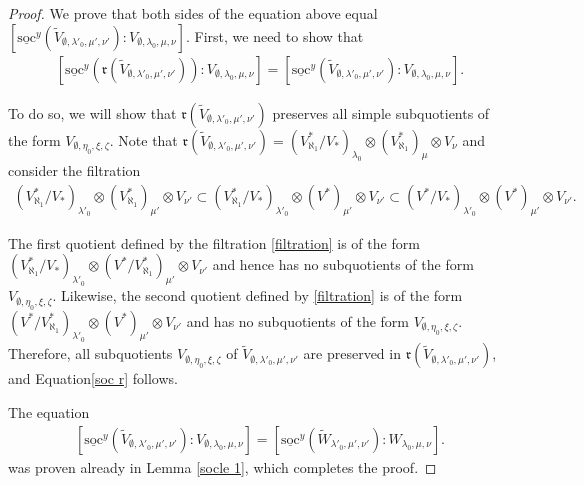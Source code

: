 \documentclass[openany, a4paper]{amsbook}
\theoremstyle{definition}
\numberwithin{equation}{chapter}
\newcommand{\socl}[2]{\underline{\mathrm{soc}}^{#1}({#2})}
\begin{document}
\begin{proof}
    We prove that both sides of the equation above equal $ \left[ \socl{y}{\tilde{V}_{\emptyset, \lambda'_0, \mu', \nu'}} \colon V_{\emptyset, \lambda_0, \mu, \nu}  \right] $. First, we need to show that
    \begin{align}\label{soc r}
        \left[ \socl{y}{\mathfrak{r}(\tilde{ V}_{\emptyset, \lambda'_0, \mu', \nu'})} \colon V_{\emptyset, \lambda_0, \mu, \nu}  \right] 
        = \left[ \socl{y}{\tilde{ V}_{\emptyset, \lambda'_0, \mu', \nu'}} \colon V_{\emptyset, \lambda_0, \mu, \nu}  \right].
    \end{align}

    To do so, we will show that $\mathfrak{r}(\tilde{ V}_{\emptyset, \lambda'_0, \mu', \nu'})$ preserves all simple subquotients of the form $V_{\emptyset, \eta_0, \xi, \zeta}$. Note that $\mathfrak{r}(\tilde{ V}_{\emptyset, \lambda'_0, \mu', \nu'}) = 
    (V^{\ast}_{\aleph_1}/V_{\ast})_{\lambda_0} \otimes (V^{\ast}_{\aleph_1})_\mu \otimes V_\nu $ and consider the filtration 
    \begin{align}\label{filtration}
        (V^{\ast}_{\aleph_1}/V_{\ast})_{\lambda'_0} \otimes (V^{\ast}_{\aleph_1})_{\mu'} \otimes V_{\nu'} 
        \subset (V^{\ast}_{\aleph_1}/V_{\ast})_{\lambda'_0} \otimes (V^{\ast})_{\mu'} \otimes V_{\nu'}
        \subset (V^{\ast}/V_{\ast})_{\lambda'_0} \otimes (V^{\ast})_{\mu'} \otimes V_{\nu'}.
    \end{align}

    The first quotient defined by the filtration \eqref{filtration} is of the form $ (V^{\ast}_{\aleph_1}/V_{\ast})_{\lambda'_0} \otimes (V^{\ast}/V^{\ast}_{\aleph_1})_{\mu'} \otimes V_{\nu'}$ and hence has no subquotients of the form $V_{\emptyset, \eta_0, \xi, \zeta}$. Likewise, the second quotient defined by \eqref{filtration} is of the form $ (V^{\ast}/V^{\ast}_{\aleph_1})_{\lambda'_0} \otimes (V^\ast)_{\mu'} \otimes V_{\nu'}$ and has no subquotients of the form $V_{\emptyset, \eta_0, \xi, \zeta}$. Therefore, all subquotients $V_{\emptyset, \eta_0, \xi, \zeta}$ of $\tilde{V}_{\emptyset, \lambda'_0, \mu', \nu'}$ are preserved in $\mathfrak{r}(\tilde{ V}_{\emptyset, \lambda'_0, \mu', \nu'})$, and Equation\eqref{soc r} follows.

    The equation 
    \begin{align}
        \left[ \socl{y}{\tilde{ V}_{\emptyset, \lambda'_0, \mu', \nu'}} \colon V_{\emptyset, \lambda_0, \mu, \nu}  \right] = 
        \left[ \socl{y}{\tilde{W}_{\lambda'_0, \mu', \nu'}} \colon W_{\lambda_0, \mu, \nu}  \right].
    \end{align}
    was proven already in Lemma \ref{socle 1}, which completes the proof.
\end{proof}
\end{document}
